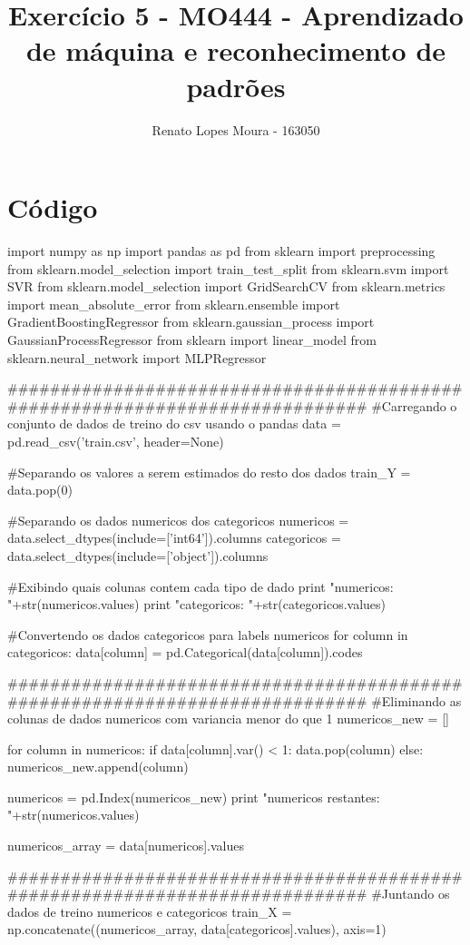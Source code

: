 \documentclass{article}
\title{Exercício 5 - MO444 - Aprendizado de máquina e reconhecimento de padrões}
\date{}
\author{Renato Lopes Moura - 163050}
\begin{document}
\maketitle

\section{Código}

%
\begin{python}
import numpy as np 
import pandas as pd
from sklearn import preprocessing
from sklearn.model_selection import train_test_split
from sklearn.svm import SVR
from sklearn.model_selection import GridSearchCV
from sklearn.metrics import mean_absolute_error
from sklearn.ensemble import GradientBoostingRegressor
from sklearn.gaussian_process import GaussianProcessRegressor
from sklearn import linear_model
from sklearn.neural_network import MLPRegressor

#############################################################################
#Carregando o conjunto de dados de treino do csv usando o pandas
data = pd.read_csv('train.csv', header=None)

#Separando os valores a serem estimados do resto dos dados
train_Y = data.pop(0)

#Separando os dados numericos dos categoricos
numericos = data.select_dtypes(include=['int64']).columns
categoricos = data.select_dtypes(include=['object']).columns

#Exibindo quais colunas contem cada tipo de dado
print "numericos: "+str(numericos.values)
print "categoricos: "+str(categoricos.values)

#Convertendo os dados categoricos para labels numericos
for column in categoricos:
	data[column] = pd.Categorical(data[column]).codes

#############################################################################
#Eliminando as colunas de dados numericos com variancia menor do que 1
numericos_new = []

for column in numericos:
	if data[column].var() < 1:
		data.pop(column)
	else:
		numericos_new.append(column)

numericos = pd.Index(numericos_new)
print "numericos restantes: "+str(numericos.values)

numericos_array = data[numericos].values

#############################################################################
#Juntando os dados de treino numericos e categoricos
train_X = np.concatenate((numericos_array, data[categoricos].values), axis=1)


\end{python}
\end{document}

